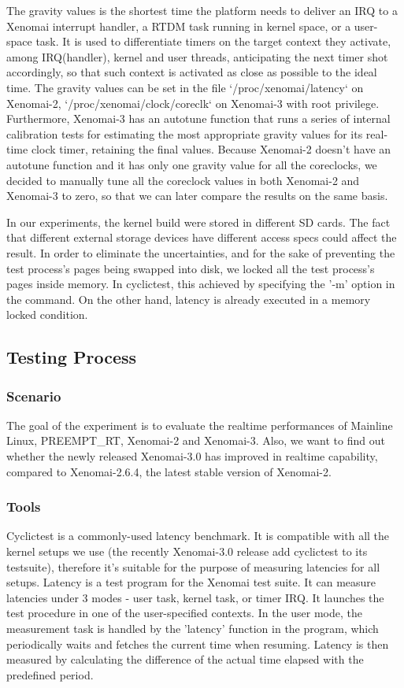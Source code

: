 \documentclass[10pt,a4paper]{article}
\begin{document}
\begin{multicols}{2}
  The gravity values is the shortest time the platform needs to deliver an IRQ to a Xenomai interrupt handler,  a RTDM task running in kernel space, or a user-space task. It is used to differentiate timers on the target context they activate, among IRQ(handler), kernel and user threads, anticipating the next timer shot accordingly, so that such context is activated as close as possible to the ideal time. The gravity values can be set in the file `/proc/xenomai/latency` on Xenomai-2, `/proc/xenomai/clock/coreclk` on Xenomai-3 with root privilege. Furthermore, Xenomai-3 has an autotune function that runs a series of internal calibration tests for estimating the most appropriate gravity values for its real-time clock timer, retaining the final values.
Because Xenomai-2 doesn't have an autotune function and it has only one gravity value for all the 
coreclocks, we decided to manually tune all the coreclock values in both Xenomai-2 and Xenomai-3 to zero, so that we can later compare the results on the same basis. 

In our experiments, the kernel build were stored in different SD cards. The fact that different external storage devices have different access specs could affect the result. In order to eliminate the uncertainties, and for the sake of preventing the test process's pages being swapped into disk, we locked all the test process's pages inside memory. In cyclictest, this achieved by specifying the '-m' option in the command. On the other hand, latency is already executed in a memory locked condition.

\subsection{Testing Process}

\subsubsection{Scenario}
The goal of the experiment is to evaluate the realtime performances of Mainline Linux, PREEMPT\_RT, 
Xenomai-2 and Xenomai-3. Also, we want to find out whether the newly released Xenomai-3.0 has improved in realtime capability, compared to Xenomai-2.6.4, the latest stable version of Xenomai-2.
\subsubsection{Tools}
Cyclictest is a commonly-used latency benchmark. It is compatible with all the kernel setups we use (the recently Xenomai-3.0 release add cyclictest to its testsuite), therefore it's suitable for the purpose of measuring latencies for all setups.
Latency is a test program for the Xenomai test suite. It can measure latencies under 3 modes - user task, kernel task, or timer IRQ. It launches the test procedure in one of the user-specified contexts. In the user mode, the measurement task is handled by the 'latency' function in the program, which periodically waits and fetches the current time when resuming. Latency is then measured by calculating the difference of the actual time elapsed with the predefined period.

\end{multicols}
\end{document}
